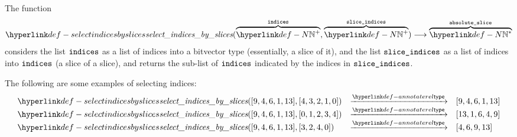 \FormallyParagraph
\begin{mathpar}
\end{mathpar}

\hypertarget{def-selectindicesbyslices}{}
The function
\[
\selectindicesbyslices(\overname{\N^+}{\indices}, \overname{\N^+}{\sliceindices})
\aslto \overname{\N^*}{\vabsslice}
\]
considers the list $\indices$ as a list of indices into a bitvector type (essentially, a slice of it),
and the list $\sliceindices$ as a list of indices into $\indices$ (a slice of a slice),
and returns the sub-list of $\indices$ indicated by the indices in $\sliceindices$.

The following are some examples of selecting indices:
\[
\begin{array}{lcl}
\selectindicesbyslices([9,4,6,1,13], [4,3,2,1,0]) &\typearrow& [9,4,6,1,13]\\
\selectindicesbyslices([9,4,6,1,13], [0,1,2,3,4]) &\typearrow& [13,1,6,4,9]\\
\selectindicesbyslices([9,4,6,1,13], [3,2,4,0])   &\typearrow& [4,6,9,13]\\
\end{array}
\]

